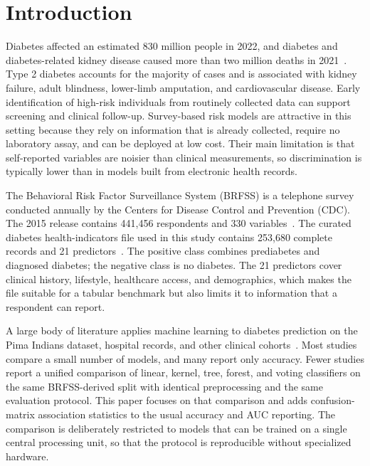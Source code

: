 \documentclass[conference]{IEEEtran}
\begin{document}
\section{Introduction}

Diabetes affected an estimated 830 million people in 2022, and diabetes and diabetes-related kidney disease caused more than two million deaths in 2021~\cite{who2021}. Type 2 diabetes accounts for the majority of cases and is associated with kidney failure, adult blindness, lower-limb amputation, and cardiovascular disease. Early identification of high-risk individuals from routinely collected data can support screening and clinical follow-up. Survey-based risk models are attractive in this setting because they rely on information that is already collected, require no laboratory assay, and can be deployed at low cost. Their main limitation is that self-reported variables are noisier than clinical measurements, so discrimination is typically lower than in models built from electronic health records.

The Behavioral Risk Factor Surveillance System (BRFSS) is a telephone survey conducted annually by the Centers for Disease Control and Prevention (CDC). The 2015 release contains 441,456 respondents and 330 variables~\cite{cdc2015brfss}. The curated diabetes health-indicators file used in this study contains 253,680 complete records and 21 predictors~\cite{kaggle2021diabetes}. The positive class combines prediabetes and diagnosed diabetes; the negative class is no diabetes. The 21 predictors cover clinical history, lifestyle, healthcare access, and demographics, which makes the file suitable for a tabular benchmark but also limits it to information that a respondent can report.

A large body of literature applies machine learning to diabetes prediction on the Pima Indians dataset, hospital records, and other clinical cohorts~\cite{ahmed2022ieee,peerbashab2023,jain2022ieee,khine2024ieee,bhattacharya2023ieee}. Most studies compare a small number of models, and many report only accuracy. Fewer studies report a unified comparison of linear, kernel, tree, forest, and voting classifiers on the same BRFSS-derived split with identical preprocessing and the same evaluation protocol. This paper focuses on that comparison and adds confusion-matrix association statistics to the usual accuracy and AUC reporting. The comparison is deliberately restricted to models that can be trained on a single central processing unit, so that the protocol is reproducible without specialized hardware.
\end{document}
